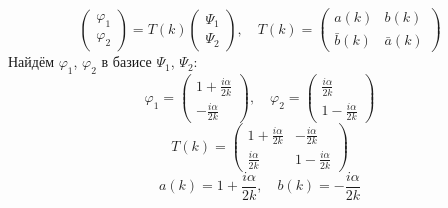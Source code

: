 \documentclass[12pt]{article}
\theoremstyle{definition}
\begin{document}
\begin{itemize}
\begin{equation}
        \left(
        \begin{array}{c}
        \varphi_1\\
        \varphi_2
        \end{array}
        \right)=T(k)\left(
        \begin{array}{c}
        \Psi_1\\
        \Psi_2
        \end{array}
        \right),\quad T(k)=\left(
        \begin{array}{cc}
        a(k) & b(k)\\
        \bar{b}(k) & \bar{a}(k)
        \end{array}
        \right)
    \end{equation}
    Найдём $\varphi_1$, $\varphi_2$ в базисе $\Psi_1$, $\Psi_2$:
    \begin{equation}
        \varphi_1=\left(
        \begin{array}{c}
        1+\frac{i\alpha}{2k}\\
        -\frac{i\alpha}{2k}
        \end{array}
        \right),\quad \varphi_2=\left(
        \begin{array}{c}
        \frac{i\alpha}{2k}\\
        1-\frac{i\alpha}{2k}
        \end{array}
        \right)
    \end{equation}
    \begin{equation}
        T(k)=\left(
        \begin{array}{cc}
        1+\frac{i\alpha}{2k} & -\frac{i\alpha}{2k}\\
        \frac{i\alpha}{2k} & 1-\frac{i\alpha}{2k}
        \end{array}
        \right)
    \end{equation}
    \begin{equation}
        \boxed{a(k)=1+\frac{i\alpha}{2k},\quad b(k)=-\frac{i\alpha}{2k}}
    \end{equation}
\end{itemize}
\end{document}
